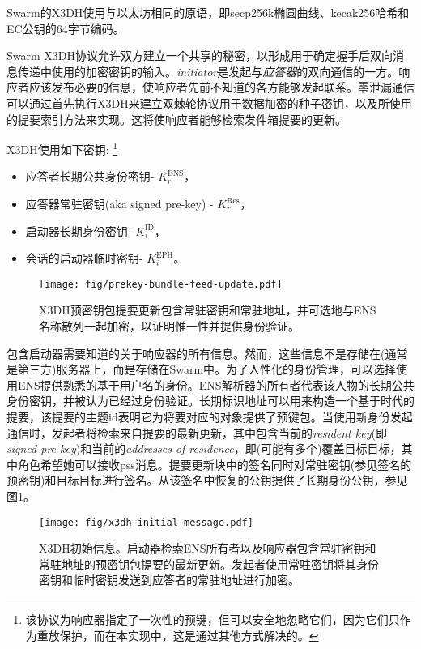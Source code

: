 Swarm的X3DH使用与以太坊相同的原语，即secp256k椭圆曲线、kecak256哈希和EC公钥的64字节编码。

Swarm X3DH协议允许双方建立一个共享的秘密，以形成用于确定握手后双向消息传递中使用的加密密钥的输入。\emph{initiator}是发起与\emph{应答器}的双向通信的一方。响应者应该发布必要的信息，使响应者先前不知道的各方能够发起联系。零泄漏通信可以通过首先执行X3DH来建立双棘轮协议用于数据加密的种子密钥，以及所使用的提要索引方法来实现。这将使响应者能够检索发件箱提要的更新。

X3DH使用如下密钥:%
%
\footnote{该协议为响应器指定了一次性的预键，但可以安全地忽略它们，因为它们只作为重放保护，而在本实现中，这是通过其他方式解决的。}

\begin{itemize}
\item 应答者长期公共身份密钥- $K^{\mathrm{ENS}}_r$，
\item 应答器常驻密钥(aka signed pre-key) - $K^{\mathrm{Res}}_r$，
\item 启动器长期身份密钥- $K^{\mathrm{ID}}_i$，
\item 会话的启动器临时密钥- $K^{\mathrm{EPH}}_i$。
\end{itemize}{}



\begin{figure}[htbp]
   \centering
   \texttt{[image: fig/prekey-bundle-feed-update.pdf]}
   \caption[X3DH预密钥包feed更新\statusgreen]{X3DH预密钥包提要更新包含常驻密钥和常驻地址，并可选地与ENS名称散列一起加密，以证明惟一性并提供身份验证。}
\label{fig:prekey-bundle-feed-update}
\end{figure}


包含启动器需要知道的关于响应器的所有信息。然而，这些信息不是存储在(通常是第三方)服务器上，而是存储在Swarm中。为了人性化的身份管理，可以选择使用ENS提供熟悉的基于用户名的身份。ENS解析器的所有者代表该人物的长期公共身份密钥，并被认为已经过身份验证。长期标识地址可以用来构造一个基于时代的提要，该提要的主题id表明它为将要对应的对象提供了预键包。当使用新身份发起通信时，发起者将检索来自提要的最新更新，其中包含当前的\emph{resident key}(即\emph{signed pre-key})和当前的\emph{addresses of residence}，即(可能有多个)覆盖目标目标，其中角色希望她可以接收pss消息。提要更新块中的签名同时对常驻密钥(参见签名的预密钥)和目标目标进行签名。从该签名中恢复的公钥提供了长期身份公钥，参见图\ref{fig:prekey-bundle-feed-update}。


\begin{figure}[htbp]
   \centering
   \texttt{[image: fig/x3dh-initial-message.pdf]}
   \caption[X3DH初始消息]{X3DH初始信息。启动器检索ENS所有者以及响应器包含常驻密钥和常驻地址的预密钥包提要的最新更新。发起者使用常驻密钥将其身份密钥和临时密钥发送到应答者的常驻地址进行加密。 }
\label{fig:x3dh-initial-message}
\end{figure}


